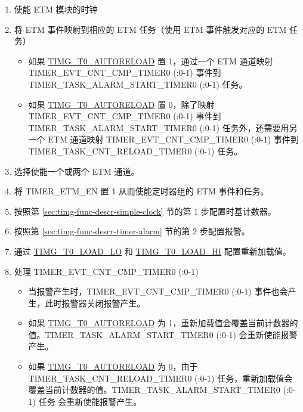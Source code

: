 \documentclass[main\_\_CN.tex]{subfiles}
\begin{document}
\begin{enumerate}
    \item 使能 ETM 模块的时钟
    \item 将 ETM 事件映射到相应的 ETM 任务（使用 ETM 事件触发对应的 ETM 任务）
    \begin{itemize}
        \item 如果 \hyperref[fielddesc:TIMGTXAUTORELOAD]{TIMG\_T0\_AUTORELOAD} 置 1，通过一个 ETM 通道映射 TIMER\_EVT\_CNT\_CMP\_TIMER0 (:0-1) 事件到 TIMER\_TASK\_ALARM\_START\_TIMER0 (:0-1) 任务。 
        \item 如果 \hyperref[fielddesc:TIMGTXAUTORELOAD]{TIMG\_T0\_AUTORELOAD} 置 0，除了映射 TIMER\_EVT\_CNT\_CMP\_TIMER0 (:0-1) 事件到 TIMER\_TASK\_ALARM\_START\_TIMER0 (:0-1) 任务外，还需要用另一个 ETM 通道映射  TIMER\_EVT\_CNT\_CMP\_TIMER0 (:0-1) 事件到 TIMER\_TASK\_CNT\_RELOAD\_TIMER0 (:0-1) 任务。
    \end{itemize}
    \item 选择使能一个或两个 ETM 通道。
    \item 将 TIMER\_ETM\_EN 置 1 从而使能定时器组的 ETM 事件和任务。
    \item 按照第 \ref{sec:timg-func-descr-simple-clock} 节的第 1 步配置时基计数器。
    \item 按照第 \ref{sec:timg-func-descr-timer-alarm} 节的第 2 步配置报警。
    \item 通过 \hyperref[fielddesc:TIMGTXLOADLO]{TIMG\_T0\_LOAD\_LO} 和 \hyperref[fielddesc:TIMGTXLOADHI]{TIMG\_T0\_LOAD\_HI} 配置重新加载值。
    \item 处理 TIMER\_EVT\_CNT\_CMP\_TIMER0 (:0-1)
    \begin{itemize}
        \item 当报警产生时，TIMER\_EVT\_CNT\_CMP\_TIMER0 (:0-1) 事件也会产生，此时报警器关闭报警产生。
        \item 如果 \hyperref[fielddesc:TIMGTXAUTORELOAD]{TIMG\_T0\_AUTORELOAD} 为 1，重新加载值会覆盖当前计数器的值。TIMER\_TASK\_ALARM\_START\_TIMER0 (:0-1) 会重新使能报警产生。
        \item 如果 \hyperref[fielddesc:TIMGTXAUTORELOAD]{TIMG\_T0\_AUTORELOAD} 为 0，由于 TIMER\_TASK\_CNT\_RELOAD\_TIMER0 (:0-1) 任务，重新加载值会覆盖当前计数器的值。TIMER\_TASK\_ALARM\_START\_TIMER0 (:0-1) 任务 会重新使能报警产生。

\end{itemize}
\end{enumerate}
\end{document}
